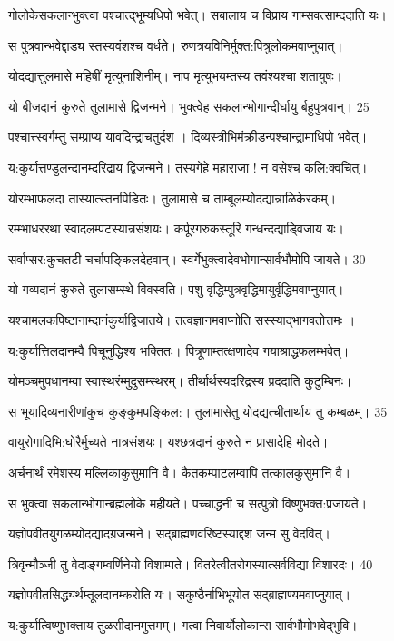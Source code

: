 गोलोकेसकलान्भुक्त्वा पश्चात्द्भूम्यधिपो भवेत्।
सबालाय च विप्राय गाम्सवत्साम्ददाति यः।

स पुत्रवान्भवेद्दाड्य स्तस्यवंशश्च वर्धते।
रुणत्रयविनिर्मुक्त:पित्रुलोकमवाप्नुयात्।

योदद्यात्तुलमासे महिषीं मृत्युनाशिनीम्।
नाप मृत्युभयम्तस्य तवंश्यश्चा शतायुषः।

यो बीजदानं कुरुते तुलामासे द्विजन्मने।
भुक्त्वेह सकलान्भोगान्दीर्घायु र्बहुपुत्रवान्। 25

पश्चात्त्स्वर्गम्तु सम्प्राप्य यावदिन्द्राचतुर्दश ।
दिव्यस्त्रीभिमंक्रीडन्पश्चान्द्रामाधिपो भवेत्।

य:कुर्यात्तण्डुलन्दानम्दरिद्राय द्विजन्मने।
तस्यगेहे महाराजा ! न वसेश्च कलि:क्वचित्।

योरम्भाफलदा तास्यात्स्तनपिडितः।
तुलामासे च ताम्बूलम्योदद्यान्नाळिकेरकम्।

रम्म्भाधररथा स्वादलम्पटस्यान्नसंशयः।
कर्पूरगरुकस्तूरि गन्धन्दद्याड्विजाय यः।

सर्वाप्सर:कुचतटी चर्चापङ्किलदेहवान्।
स्वर्गेभुक्त्वादेवभोगान्सार्वभौमोपि जायते। 30

यो गव्यदानं कुरुते तुलासम्स्थे विवस्वति।
पशु वृद्धिम्पुत्रवृद्धिमायुर्वृद्धिमवाप्नुयात्।

यश्चामलकपिष्टानाम्दानंकुर्याद्विजातये।
तत्वज्ञानमवाप्नोति सस्स्याद्भागवतोत्तमः ।

य:कुर्यात्तिलदानम्वै पिचूनुद्धिश्य भक्तितः।
पित्रूणाम्तत्क्षणादेव गयाश्राद्धफलम्भवेत्।

योमञ्चमुपधानम्वा स्वास्थरंम्मुदुसम्स्थरम्।
तीर्थार्थस्यदरिद्रस्य प्रददाति कुटुम्बिनः।

स भूयादिव्यनारीणांकुच कुङ्कुमपङ्किल:।
तुलामासेतु योदद्यत्चीतार्थाय तु कम्बळम्। 35

वायुरोगादिभि:घोरैर्मुच्यते नात्रसंशयः।
यश्छत्रदानं कुरुते न प्रासादेहि मोदते।

अर्चनार्थं रमेशस्य मल्लिकाकुसुमानि वै।
कैतकम्पाटलम्वापि तत्कालकुसुमानि वै।

स भुक्त्वा सकलान्भोगान्ब्रह्मलोके महीयते।
पच्चाद्धनी च सत्पुत्रो विष्णुभक्त:प्रजायते।

यज्ञोपवीतयुगळम्योदद्यादग्रजन्मने।
सद्ब्राह्मणवरिष्टस्याद्दश जन्म सु वेदवित्।

त्रिवृन्मौञ्जी तु वेदाङ्गम्वर्णिनेयो विशाम्पते।
वितरेत्वीतरोगस्यात्सर्वविद्या विशारदः। 40


यज्ञोपवीतसिद्ध्यर्थम्तूलदानम्करोति यः।
सकुष्ठैर्नाभिभूयोत सद्ब्राह्मण्यमवाप्नुयात्।

य:कुर्यात्विष्णुभक्ताय तुळसीदानमुत्तमम्।
गत्वा निवार्योलोकान्स सार्वभौमोभवेद्भुवि।

